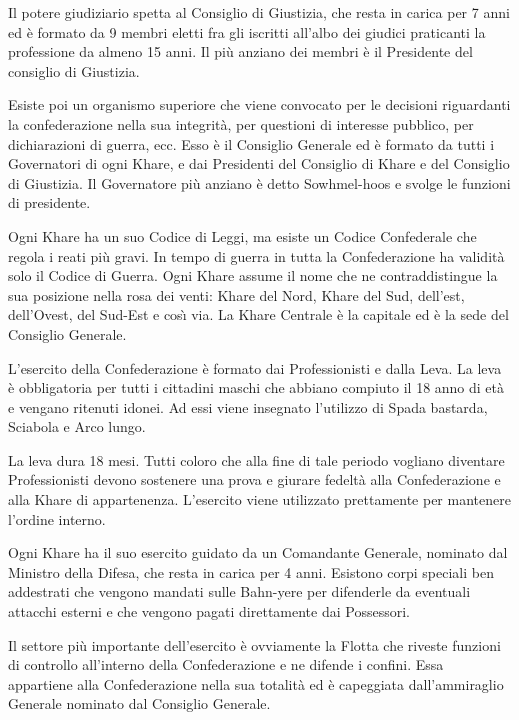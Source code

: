 Il potere giudiziario spetta al Consiglio di Giustizia, che resta in
carica per 7 anni ed \`e formato da 9 membri eletti fra gli iscritti
all'albo dei giudici praticanti la professione da almeno 15 anni.
Il pi\`u anziano dei membri \`e il Presidente del consiglio di
Giustizia.

Esiste poi un organismo superiore che viene convocato per le decisioni
riguardanti la confederazione nella sua integrit\`a, per questioni di
interesse pubblico, per dichiarazioni di guerra, ecc. Esso \`e il
Consiglio Generale ed \`e formato da tutti i Governatori di ogni
Khare, e dai Presidenti del Consiglio di Khare e del Consiglio di
Giustizia. Il Governatore pi\`u anziano \`e detto Sowhmel-hoos e
svolge le fun\-zioni di pre\-si\-den\-te.

Ogni Khare ha un suo Codice di Leggi, ma esiste un Codice Confederale
che regola i reati pi\`u gravi. In tempo di guerra in tutta la
Confederazione ha validit\`a solo il Codice di Guerra. Ogni Khare
assume il nome che ne contraddistingue la sua posizione nella rosa dei
venti: Khare del Nord, Khare del Sud, dell'est, dell'Ovest, del
Sud-Est e cos\`{\i}  via. La Khare Centrale \`e la capitale ed \`e la
sede del Consiglio Generale.


\Esercito L'esercito della Confederazione \`e formato dai
Professionisti e dalla Leva.  La leva \`e obbligatoria per tutti i
cittadini maschi che abbiano compiuto il 18 anno di et\`a e vengano
ritenuti idonei. Ad essi viene insegnato l'utilizzo di Spada bastarda,
Sciabola e Arco lungo.

La leva dura 18 mesi. Tutti coloro che alla fine di tale periodo
vogliano diventare Professionisti devono sostenere una prova e giurare
fedelt\`a alla Confederazione e alla Khare di appartenenza.
L'esercito viene utilizzato prettamente per mantenere l'ordine
interno.

Ogni Khare ha il suo esercito guidato da un Comandante Generale,
nominato dal Ministro della Difesa, che resta in carica per 4 anni.
Esistono corpi speciali ben addestrati che vengono mandati sulle Bahn-yere
per difenderle da eventuali attacchi esterni e che vengono pagati
direttamente dai Possessori.

Il settore pi\`u importante dell'esercito \`e ovviamente la Flotta che
riveste funzioni di controllo all'interno della Confederazione e ne
difende i confini. Essa appartiene alla Confederazione nella sua
totalit\`a ed \`e capeggiata dall'ammiraglio Generale nominato dal
Consiglio Generale.


